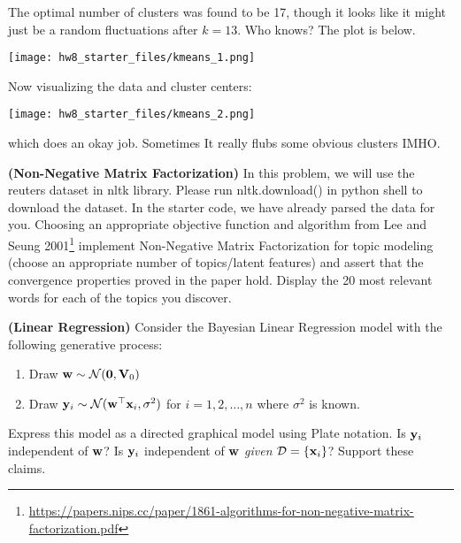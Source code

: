 \documentclass[12pt,letterpaper,fleqn]{hmcpset}
\begin{document}
\begin{solution}
The optimal number of clusters was found to be 17, though it looks like it might just be a random fluctuations after $k = 13$. Who knows? The plot is below.
\begin{center}
    \texttt{[image: hw8\_starter\_files/kmeans\_1.png]}
\end{center}

Now visualizing the data and cluster centers:
\begin{center}
    \texttt{[image: hw8\_starter\_files/kmeans\_2.png]}
\end{center}
which does an okay job. Sometimes It really flubs some obvious clusters IMHO.
\vfill
\end{solution}
\newpage




\begin{problem}
\textbf{(Non-Negative Matrix Factorization)} 
In this problem, we will use the reuters dataset in nltk library. Please run nltk.download() in python shell to download the dataset. In the starter code, we have already parsed the data for you. 
\newline
\newline
Choosing an appropriate
objective function and algorithm from Lee and Seung 2001\footnote{\url{https://papers.nips.cc/paper/1861-algorithms-for-non-negative-matrix-factorization.pdf}}
implement Non-Negative Matrix Factorization for topic modeling (choose an appropriate number
of topics/latent features) and assert that the convergence properties proved in the paper hold. 
Display the 20 most relevant words for each of the topics you discover.
\end{problem}
\begin{solution}
\vfill
\end{solution}
\newpage

\begin{problem}
\textbf{(Linear Regression)} Consider the Bayesian Linear Regression model with
the following generative process:
\begin{enumerate}[(1)]
    \item Draw ${\bf w} \sim {\cal N}({\bf 0}, \mathbf{V}_0)$
    \item Draw ${\bf y}_i \sim {\cal N}({\bf w}^\top{\bf x}_i, \sigma^2)$ for $i=1,2,\dots,n$ where $\sigma^2$
        is known.
\end{enumerate}
Express this model as a directed graphical model using Plate notation. Is ${\bf y}_i$
independent of ${\bf w}$? Is ${\bf y}_i$ independent of ${\bf w}$ \textit{given} ${\cal D} = \{{\bf x}_i\}$? Support
these claims.
\end{problem}
\begin{solution}
\vfill
\end{solution}
\newpage
\end{document}
